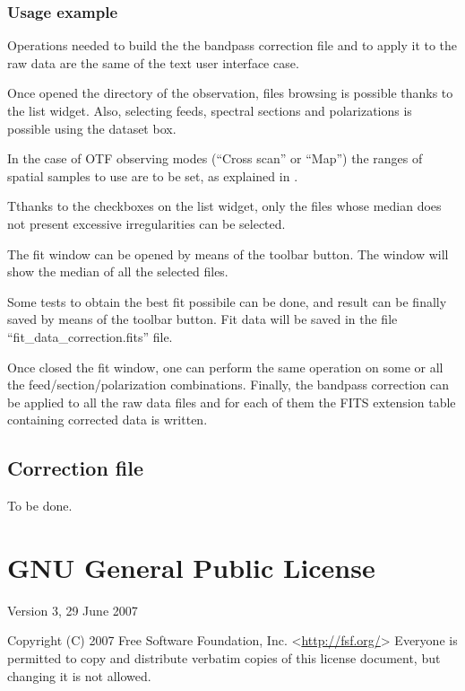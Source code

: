 \documentclass[letterpaper,10pt,english]{sphinxmanual}
\begin{document}
\subsection{Usage example}
\label{guibp:usage-example}
Operations needed to build the the bandpass correction file and to apply it to
the raw data are the same of the text user interface case.

Once opened the directory of the observation, files browsing is possible thanks to the list widget. Also, selecting feeds, spectral sections and polarizations
is possible using the dataset box.

In the case of OTF observing modes (``Cross scan'' or ``Map'') the
ranges of spatial samples to use are to be set, as explained in {\hyperref[tuibp::doc]{}}.

Tthanks to the checkboxes on the list widget, only the files whose median does not present excessive irregularities can be selected.

The fit window can be opened by means of the toolbar button. The window will
show the median of all the selected files.

Some tests to obtain the best fit possibile can be done, and result can be
finally saved by means of the toolbar button.
Fit data will be saved in the file ``fit\_data\_correction.fits'' file.

Once closed the fit window, one can perform the same operation on some or
all the feed/section/polarization combinations. Finally, the bandpass
correction can be applied to all the raw data files and for each of them the
FITS extension table containing corrected data is written.


\section{Correction file}
\label{correction_file:correction-file}\label{correction_file::doc}
To be done.


\chapter{GNU General Public License}
\label{license:gnu-general-public-license}\label{license::doc}
\noindent{}

Version 3, 29 June 2007

Copyright (C) 2007 Free Software Foundation, Inc. \textless{}\url{http://fsf.org/}\textgreater{}
Everyone is permitted to copy and distribute verbatim copies
of this license document, but changing it is not allowed.
\end{document}

